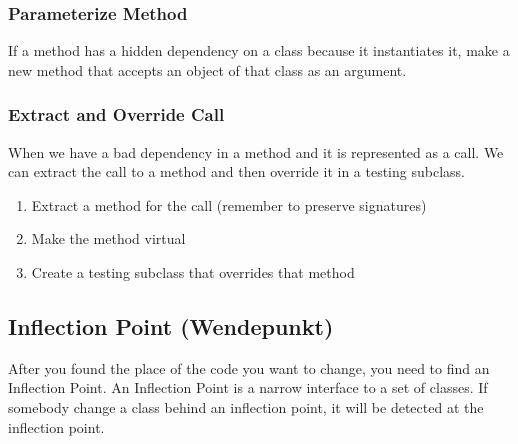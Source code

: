 \hypertarget{parameterize-method}{%
\subsubsection{Parameterize Method}\label{parameterize-method}}

If a method has a hidden dependency on a class because it instantiates
it, make a new method that accepts an object of that class as an
argument.

\hypertarget{extract-and-override-call}{%
\subsubsection{Extract and Override
Call}\label{extract-and-override-call}}

When we have a bad dependency in a method and it is represented as a
call. We can extract the call to a method and then override it in a
testing subclass.

\begin{enumerate}
\def\labelenumi{\arabic{enumi}.}
\tightlist
\item
  Extract a method for the call (remember to preserve signatures)
\item
  Make the method virtual
\item
  Create a testing subclass that overrides that method
\end{enumerate}




\subsection{Inflection Point (Wendepunkt)}
After you found the place of the code you want to change, you need to find an Inflection Point. An Inflection Point is a narrow interface to a set of classes. If somebody change a class behind an inflection point, it will be detected at the inflection point.